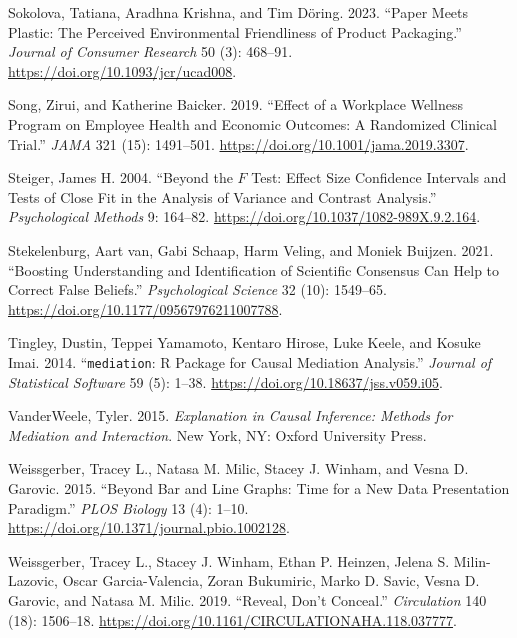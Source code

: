 \documentclass[
  11pt,
  letterpaper,
]{scrbook}
\newlength{\cslhangindent}
\newlength{\cslentryspacingunit} %
\newenvironment{CSLReferences}[2] %
 {%
  \setlength{\parindent}{0pt}
  \ifodd #1
  \let\oldpar\par
  \def\par{\hangindent=\cslhangindent\oldpar}
  \fi
  \setlength{\parskip}{#2\cslentryspacingunit}
 }%
 {}
\theoremstyle{definition}
\theoremstyle{remark}
\begin{document}
\begin{CSLReferences}{1}{0}
\leavevmode{}%
Sokolova, Tatiana, Aradhna Krishna, and Tim Döring. 2023. {``Paper Meets
Plastic: The Perceived Environmental Friendliness of Product
Packaging.''} \emph{Journal of Consumer Research} 50 (3): 468--91.
\url{https://doi.org/10.1093/jcr/ucad008}.

\leavevmode{}%
Song, Zirui, and Katherine Baicker. 2019. {``{Effect of a Workplace
Wellness Program on Employee Health and Economic Outcomes: A Randomized
Clinical Trial}.''} \emph{JAMA} 321 (15): 1491--501.
\url{https://doi.org/10.1001/jama.2019.3307}.

\leavevmode{}%
Steiger, James H. 2004. {``Beyond the \(F\) Test: Effect Size Confidence
Intervals and Tests of Close Fit in the Analysis of Variance and
Contrast Analysis.''} \emph{Psychological Methods} 9: 164--82.
\url{https://doi.org/10.1037/1082-989X.9.2.164}.

\leavevmode{}%
Stekelenburg, Aart van, Gabi Schaap, Harm Veling, and Moniek Buijzen.
2021. {``Boosting Understanding and Identification of Scientific
Consensus Can Help to Correct False Beliefs.''} \emph{Psychological
Science} 32 (10): 1549--65.
\url{https://doi.org/10.1177/09567976211007788}.

\leavevmode{}%
Tingley, Dustin, Teppei Yamamoto, Kentaro Hirose, Luke Keele, and Kosuke
Imai. 2014. {``\texttt{mediation}: {R} Package for Causal Mediation
Analysis.''} \emph{Journal of Statistical Software} 59 (5): 1--38.
\url{https://doi.org/10.18637/jss.v059.i05}.

\leavevmode{}%
VanderWeele, Tyler. 2015. \emph{Explanation in Causal Inference: Methods
for Mediation and Interaction}. New York, NY: Oxford University Press.

\leavevmode{}%
Weissgerber, Tracey L., Natasa M. Milic, Stacey J. Winham, and Vesna D.
Garovic. 2015. {``Beyond Bar and Line Graphs: Time for a New Data
Presentation Paradigm.''} \emph{PLOS Biology} 13 (4): 1--10.
\url{https://doi.org/10.1371/journal.pbio.1002128}.

\leavevmode{}%
Weissgerber, Tracey L., Stacey J. Winham, Ethan P. Heinzen, Jelena S.
Milin-Lazovic, Oscar Garcia-Valencia, Zoran Bukumiric, Marko D. Savic,
Vesna D. Garovic, and Natasa M. Milic. 2019. {``Reveal, Don't
Conceal.''} \emph{Circulation} 140 (18): 1506--18.
\url{https://doi.org/10.1161/CIRCULATIONAHA.118.037777}.


\end{CSLReferences}
\end{document}
